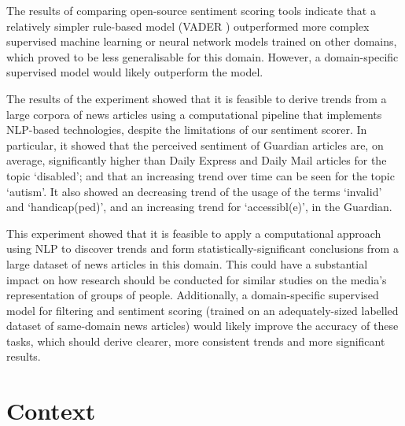\documentclass{report}
\begin{document}
The results of comparing open-source sentiment scoring tools indicate that a relatively simpler rule-based model (VADER \cite{VADER}) outperformed more complex supervised machine learning or neural network models trained on other domains, which proved to be less generalisable for this domain.
However, a domain-specific supervised model would likely outperform the model.

The results of the experiment showed that it is feasible to derive trends from a large corpora of news articles using a computational pipeline that implements NLP-based technologies, despite the limitations of our sentiment scorer.
In particular, it showed that the perceived sentiment of Guardian articles are, on average, significantly higher than Daily Express and Daily Mail articles for the topic `disabled'; and that an increasing trend over time can be seen for the topic `autism'.
It also showed an decreasing trend of the usage of the terms `invalid' and `handicap(ped)', and an increasing trend for `accessibl(e)', in the Guardian.

This experiment showed that it is feasible to apply a computational approach using NLP to discover trends and form statistically-significant conclusions from a large dataset of news articles in this domain.
This could have a substantial impact on how research should be conducted for similar studies on the media's representation of groups of people.
Additionally, a domain-specific supervised model for filtering and sentiment scoring (trained on an adequately-sized labelled dataset of same-domain news articles) would likely improve the accuracy of these tasks, which should derive clearer, more consistent trends and more significant results.   



\chapter{Context} \label{Context} %



\end{document}
